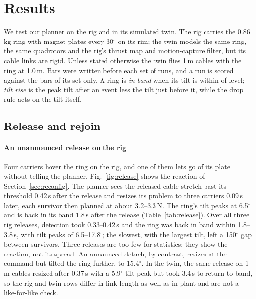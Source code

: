 \section{Results}
\label{sec:results}

We test our planner on the rig and in its simulated twin. The rig carries the 0.86\,kg ring with magnet plates every
30$^\circ$ on its rim; the twin models the same ring, the same quadrotors and the rig's thrust map and motion-capture
filter, but its cable links are rigid. Unless stated otherwise the twin flies 1\,m cables with the ring at 1.0\,m.
Bars were written before each set of runs, and a run is scored against the bars of its set only. A ring
is \emph{in band} when its tilt is within  of level; \emph{tilt rise} is the peak tilt
after an event less the tilt just before it, while the drop rule acts on the tilt itself.

\subsection{Release and rejoin}
\label{sec:res_reconfig}

\paragraph{An unannounced release on the rig}
Four carriers hover the ring on the rig, and one of them lets go of its plate without telling the planner.
Fig.~\ref{fig:release} shows the reaction of Section~\ref{sec:reconfig}. The planner sees the released cable stretch
past its threshold 0.42\,s after the release and resizes its problem to three carriers 0.09\,s later, each survivor
then planned at about 3.2--3.3\,N. The ring's tilt peaks at 6.5$^\circ$ and is back in its band 1.8\,s after the
release (Table~\ref{tab:release}). Over all three rig releases, detection took 0.33--0.42\,s and the ring was back in
band within 1.8--3.8\,s, with tilt peaks of 6.5--17.8$^\circ$; the slowest, with the largest tilt, left a
150$^\circ$ gap between survivors. Three releases are too few for statistics; they show the reaction, not its spread. An announced
detach, by contrast, resizes at the command but tilted the ring further, to 15.4$^\circ$. In the twin, the same
release on 1\,m cables resized after 0.37\,s with a 5.9$^\circ$ tilt peak but took 3.4\,s to return to band, so the
rig and twin rows differ in link length as well as in plant and are not a like-for-like check.

